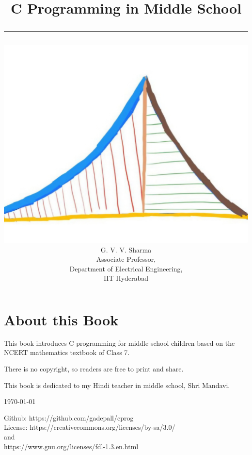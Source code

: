 \documentclass[journal]{IEEEtran}
\begin{document}

\onecolumn


\title{
	\begin{center}
	C Programming in Middle School
	\\
\rule{0.4\columnwidth}{0.4pt}
\end{center}
}
\author{
\vspace{11cm}
	\begin{center}
\includegraphics[width=0.2\columnwidth]{figs/logo.jpg}
\\
		{\huge	G. V. V. Sharma}\\Associate Professor,\\Department of Electrical Engineering, \\ IIT Hyderabad
	\end{center}
}
\maketitle

\newpage
\section*{About this Book}

This book introduces C programming for middle school children based on the
 NCERT mathematics textbook of Class 7.  

There is no copyright, so readers are free to print and share.  

This book is dedicated to my Hindi teacher in middle school, Shri Mandavi.
\begin{flushright}
\today
\end{flushright}
Github: https://github.com/gadepall/cprog
		\\
License: https://creativecommons.org/licenses/by-sa/3.0/
\\
and
\\
https://www.gnu.org/licenses/fdl-1.3.en.html
\end{document}
